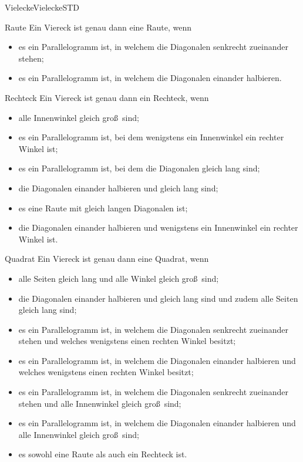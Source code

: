 \begin{MXContent}{Vielecke}{Vielecke}{STD}
\begin{MXInfo}{Raute}%
Ein Viereck ist genau dann eine Raute, wenn
\begin{itemize}
 \item es ein Parallelogramm ist, in welchem die Diagonalen senkrecht zueinander stehen;
 \item es ein Parallelogramm ist, in welchem die Diagonalen einander halbieren.
\end{itemize}
\end{MXInfo}


\begin{MXInfo}{Rechteck}%
Ein Viereck ist genau dann ein Rechteck, wenn
\begin{itemize}
 \item alle Innenwinkel gleich gro\ss\ sind;
\item es ein Parallelogramm ist, bei dem wenigstens ein Innenwinkel ein rechter Winkel ist;
\item es ein Parallelogramm ist, bei dem die Diagonalen gleich lang sind; 
\item die Diagonalen einander halbieren und gleich lang sind;
\item es eine Raute mit gleich langen Diagonalen ist;
\item die Diagonalen einander halbieren und wenigstens ein Innenwinkel ein rechter Winkel ist.
\end{itemize}
\end{MXInfo}


\begin{MXInfo}{Quadrat}%
Ein Viereck ist genau dann eine Quadrat, wenn
\begin{itemize}
\item alle Seiten gleich lang und alle Winkel gleich gro\ss\ sind;
 \item die Diagonalen einander halbieren und gleich lang sind und zudem alle Seiten gleich lang sind;
 \item es ein Parallelogramm ist, in welchem die Diagonalen senkrecht zueinander stehen und welches wenigstens einen rechten Winkel besitzt;
 \item es ein Parallelogramm ist, in welchem die Diagonalen einander halbieren und welches wenigstens einen rechten Winkel besitzt;
 \item es ein Parallelogramm ist, in welchem die Diagonalen senkrecht zueinander stehen und alle Innenwinkel gleich gro\ss\ sind;
 \item es ein Parallelogramm ist, in welchem die Diagonalen einander halbieren und alle Innenwinkel gleich gro\ss\ sind;
\item es sowohl eine Raute als auch ein Rechteck ist.
\end{itemize}
\end{MXInfo}

\end{MXContent}


